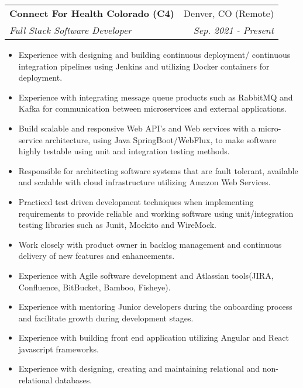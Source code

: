 \documentclass[letterpaper,11pt]{article}
\makeatletter
\newcommand{\resumeItem}[2]{
  \item\small{
    \textbf{#1}{#2 \vspace{-2pt}}
  }
}
\newcommand{\resumeSubheading}[4]{
  \vspace{-1pt}\item
    \begin{tabular*}{0.97\textwidth}[t]{l@{\extracolsep{\fill}}r}
      \textbf{#1} & #2 \\
      \textit{\small#3} & \textit{\small #4} \\
    \end{tabular*}\vspace{-5pt}
}
\newcommand{\resumeItemListStart}{\begin{itemize}}
\newcommand{\resumeItemListEnd}{\end{itemize}\vspace{-5pt}}
\makeatother
\begin{document}
    \resumeSubheading
      {Connect For Health Colorado (C4)}{Denver, CO (Remote)}
      {Full Stack Software Developer}{Sep. 2021 - Present}
      \resumeItemListStart
        \resumeItem{}
          {Experience with designing and building continuous deployment/ continuous integration pipelines using Jenkins and utilizing Docker containers for deployment.}
        \resumeItem{}
          {Experience with integrating message queue products such as RabbitMQ and Kafka for communication between microservices and external applications.}
        \resumeItem{}
          {Build scalable and responsive Web API’s and Web services with a micro-service architecture, using Java SpringBoot/WebFlux, to make software highly testable using unit and integration testing methods.}
        \resumeItem{}
          {Responsible for architecting software systems that are fault tolerant, available and scalable with cloud infrastructure utilizing Amazon Web Services.}
        \resumeItem{}
          {Practiced test driven development techniques when implementing requirements to provide reliable and working software using unit/integration testing libraries such as Junit, Mockito and WireMock.}
        \resumeItem{}
          {Work closely with product owner in backlog management and continuous delivery of new features and enhancements.}
        \resumeItem{}
          {Experience with Agile software development and Atlassian tools(JIRA, Confluence, BitBucket, Bamboo, Fisheye).}
        \resumeItem{}
          {Experience with mentoring Junior developers during the onboarding process and facilitate growth during development stages.}
        \resumeItem{}
          {Experience with building front end application utilizing Angular and React javascript frameworks.}
        \resumeItem{}
          {Experience with designing, creating and maintaining relational and non-relational databases.}
      \resumeItemListEnd
\end{document}
